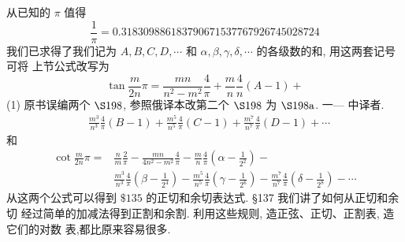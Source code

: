 从已知的 $\pi$ 值得
\[
\frac{1}{\pi}=0.318309886183790671537767926745028724
\]
我们已求得了我们记为 $A, B, C, D, \cdots$ 和 $\alpha, \beta, \gamma, \delta, \cdots$ 的各级数的和, 用这两套记号可将 上节公式改写为
\[
\tan \frac{m}{2 n} \pi=\frac{m n}{n^{2}-m^{2}} \frac{4}{\pi}+\frac{m}{n} \frac{4}{n}(A-1)+
\]
(1) 原书误编两个 $\S 198$, 参照俄译本改第二个 $\S 198$ 为 $\S 198 \mathrm{a}$. 一— 中译者. 
\[
\begin{aligned}
& \frac{m^{3}}{n^{3}} \frac{4}{\pi}(B-1)+\frac{m^{5}}{n^{5}} \frac{4}{\pi}(C-1)+\frac{m^{7}}{n^{7}} \frac{4}{\pi}(D-1)+\cdots
\end{aligned}
\]
和
\[
\begin{aligned}
\cot \frac{m}{2 n} \pi= & \frac{n}{m} \frac{2}{\pi}-\frac{m n}{4 n^{2}-m^{2}} \frac{4}{\pi}-\frac{m}{n} \frac{4}{\pi}\left(\alpha-\frac{1}{2^{2}}\right)- \\
& \frac{m^{3}}{n^{3}} \frac{4}{\pi}\left(\beta-\frac{1}{2^{4}}\right)-\frac{m^{5}}{n^{5}} \frac{4}{\pi}\left(\gamma-\frac{1}{2^{6}}\right)-\frac{m^{7}}{n^{7}} \frac{4}{\pi}\left(\delta-\frac{1}{2^{8}}\right)-\cdots
\end{aligned}
\]
从这两个公式可以得到 $\$ 135$ 的正切和余切表达式. §137 我们讲了如何从正切和余切 经过简单的加减法得到正割和余割. 利用这些规则, 造正弦、正切、正割表, 造它们的对数 表,都比原来容易很多. 

